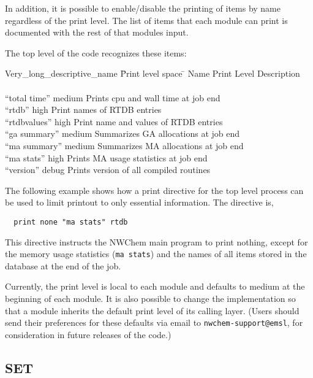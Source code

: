 In addition, it is possible to enable/disable the printing of items by
name regardless of the print level.  The list of items that each
module can print is documented with the rest of that modules input.

The top level of the code recognizes these items:
\begin{tabbing}
  Very\_long\_descriptive\_name \= Print level space \= \kill
  Name                   \> Print Level \> Description \\
                         \>        \> \\
 ``total time''        \> medium \> Prints cpu and wall time at job end\\
 ``rtdb''              \> high    \> Print names of RTDB entries\\
 ``rtdbvalues''        \> high    \> Print name and values of RTDB entries\\
 ``ga summary''        \> medium \> Summarizes GA allocations at job end \\
 ``ma summary''        \> medium \> Summarizes MA allocations at job end \\
 ``ma stats''          \> high   \> Prints MA usage statistics at job end \\
 ``version''           \> debug  \> Prints version of all compiled routines \\
\end{tabbing}


The following example shows how a print directive for the top level
process can be used to limit printout to only essential information.
The directive is,

\begin{verbatim}
  print none "ma stats" rtdb
\end{verbatim}

This directive instructs the NWChem main program to print nothing,
except for the memory usage statistics (\verb+ma stats+) and
the names of all items stored in the database at the end of the job.

Currently, the print level is local to each module and defaults to
medium at the beginning of each module.  It is also possible to change
the implementation so that a module inherits the default print level
of its calling layer.  (Users should send their preferences for these
defaults via email to \verb+nwchem-support@emsl+, for consideration in
future releases of the code.)

\subsection{SET}
\label{sec:set}

